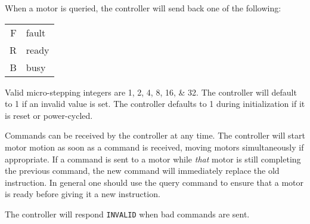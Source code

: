\documentclass[11pt]{article}
\begin{document}
When a motor is queried, the controller will send back one of the following:

\begin{center}
	\begin{tabular}{r | l}
		F & fault \\ 
		R & ready \\
		B & busy
	\end{tabular}
\end{center}

Valid micro-stepping integers are 1, 2, 4, 8, 16, \& 32. The controller will default to 1 if an invalid value is set. The controller defaults to 1 during initialization if it is reset or power-cycled.

Commands can be received by the controller at any time. The controller will start motor motion as soon as a command is received, moving motors simultaneously if appropriate. If a command is sent to a motor while \textit{that} motor is still completing the previous command, the new command will immediately replace the old instruction. In general one should use the query command to ensure that a motor is ready before giving it a new instruction.

The controller will respond \texttt{INVALID} when bad commands are sent.
\end{document}
